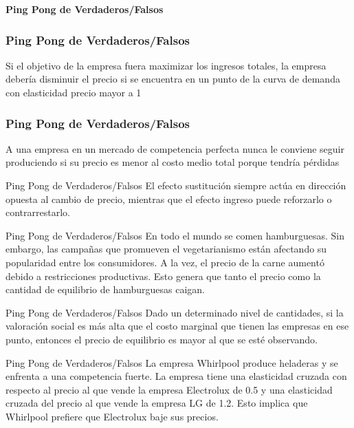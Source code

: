 \documentclass{beamer}
\begin{document}
\begin{frame}
    \centering
    \begin{boxB}
    \centering \Large \textbf{Ping Pong de Verdaderos/Falsos} \\   
    \end{boxB}
\end{frame}

\begin{frame}
\frametitle{Ping Pong de Verdaderos/Falsos}
\centering
Si el objetivo de la empresa fuera maximizar los ingresos totales, la empresa debería disminuir el precio si se encuentra en un punto de la curva de demanda con elasticidad precio mayor a 1
\end{frame}

\begin{frame}
\frametitle{Ping Pong de Verdaderos/Falsos}
\centering
A una empresa en un mercado de competencia perfecta nunca le conviene seguir produciendo si su precio es menor al costo medio total porque tendría pérdidas
\end{frame}

\begin{frame}{Ping Pong de Verdaderos/Falsos}
    \centering
    El efecto sustitución siempre actúa en dirección opuesta al cambio de precio, mientras que el efecto ingreso puede reforzarlo o contrarrestarlo.
\end{frame}

\begin{frame}{Ping Pong de Verdaderos/Falsos}
    \centering
    En todo el mundo se comen hamburguesas. Sin embargo, las campañas que promueven el vegetarianismo están afectando su popularidad entre los consumidores. A la vez, el precio de la carne aumentó debido a restricciones productivas. Esto genera que tanto el precio como la cantidad de equilibrio de hamburguesas caigan. 
\end{frame}

\begin{frame}{Ping Pong de Verdaderos/Falsos}
    \centering
    Dado un determinado nivel de cantidades, si la valoración social es más alta que el costo marginal que tienen las empresas en ese punto, entonces el precio de equilibrio es mayor al que se esté observando.
\end{frame}

\begin{frame}{Ping Pong de Verdaderos/Falsos}
    \centering
    La empresa Whirlpool produce heladeras y se enfrenta a una competencia fuerte. La empresa tiene una elasticidad cruzada con respecto al precio al que vende la empresa Electrolux de 0.5 y una elasticidad cruzada del precio al que vende la empresa LG de 1.2. Esto implica que Whirlpool prefiere que Electrolux baje sus precios.
\end{frame}
\end{document}
